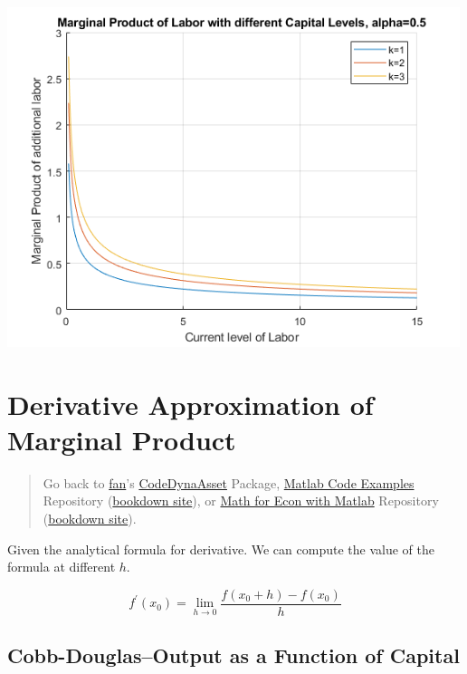 \documentclass[
]{book}
\begin{document}
\includegraphics[width=5.20833in,height=\textheight]{img/derivative_cobb_douglas_images/figure_1.png}

\hypertarget{derivative-approximation-of-marginal-product}{%
\section{Derivative Approximation of Marginal Product}\label{derivative-approximation-of-marginal-product}}

\begin{quote}
Go back to \href{http://fanwangecon.github.io/}{fan}'s \href{https://fanwangecon.github.io/CodeDynaAsset/}{CodeDynaAsset} Package, \href{https://fanwangecon.github.io/M4Econ/}{Matlab Code Examples} Repository (\href{https://fanwangecon.github.io/M4Econ/bookdown}{bookdown site}), or \href{https://fanwangecon.github.io/Math4Econ/}{Math for Econ with Matlab} Repository (\href{https://fanwangecon.github.io/Math4Econ/bookdown}{bookdown site}).
\end{quote}

Given the analytical formula for derivative. We can compute the value of
the formula at different \(h\).

\[f^{\prime } (x_0 )=\lim_{h\to 0} \frac{f(x_0 +h)-f(x_0 )}{h}\]

\hypertarget{cobb-douglasoutput-as-a-function-of-capital}{%
\subsection{Cobb-Douglas--Output as a Function of Capital}\label{cobb-douglasoutput-as-a-function-of-capital}}
\end{document}

